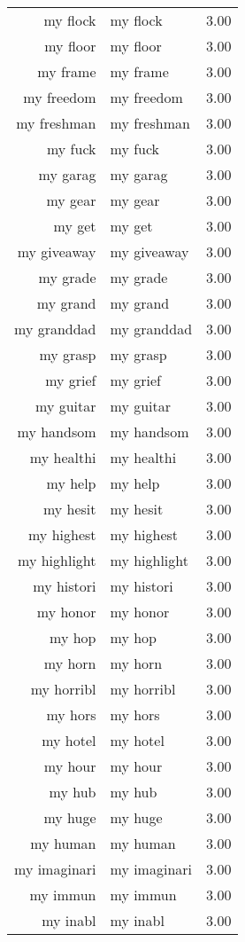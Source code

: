 \begin{table}[ht]
\begin{tabular}{rlr}
  my flock & my flock & 3.00 \\ 
  my floor & my floor & 3.00 \\ 
  my frame & my frame & 3.00 \\ 
  my freedom & my freedom & 3.00 \\ 
  my freshman & my freshman & 3.00 \\ 
  my fuck & my fuck & 3.00 \\ 
  my garag & my garag & 3.00 \\ 
  my gear & my gear & 3.00 \\ 
  my get & my get & 3.00 \\ 
  my giveaway & my giveaway & 3.00 \\ 
  my grade & my grade & 3.00 \\ 
  my grand & my grand & 3.00 \\ 
  my granddad & my granddad & 3.00 \\ 
  my grasp & my grasp & 3.00 \\ 
  my grief & my grief & 3.00 \\ 
  my guitar & my guitar & 3.00 \\ 
  my handsom & my handsom & 3.00 \\ 
  my healthi & my healthi & 3.00 \\ 
  my help & my help & 3.00 \\ 
  my hesit & my hesit & 3.00 \\ 
  my highest & my highest & 3.00 \\ 
  my highlight & my highlight & 3.00 \\ 
  my histori & my histori & 3.00 \\ 
  my honor & my honor & 3.00 \\ 
  my hop & my hop & 3.00 \\ 
  my horn & my horn & 3.00 \\ 
  my horribl & my horribl & 3.00 \\ 
  my hors & my hors & 3.00 \\ 
  my hotel & my hotel & 3.00 \\ 
  my hour & my hour & 3.00 \\ 
  my hub & my hub & 3.00 \\ 
  my huge & my huge & 3.00 \\ 
  my human & my human & 3.00 \\ 
  my imaginari & my imaginari & 3.00 \\ 
  my immun & my immun & 3.00 \\ 
  my inabl & my inabl & 3.00 \\ 

\end{tabular}
\end{table}
